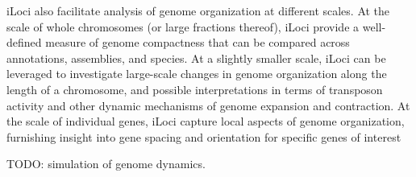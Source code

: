 iLoci also facilitate analysis of genome organization at different scales.
At the scale of whole chromosomes (or large fractions thereof), iLoci provide a well-defined measure of genome compactness that can be compared across annotations, assemblies, and species.
At a slightly smaller scale, iLoci can be leveraged to investigate large-scale changes in genome organization along the length of a chromosome, and possible interpretations in terms of transposon activity and other dynamic mechanisms of genome expansion and contraction.
At the scale of individual genes, iLoci capture local aspects of genome organization, furnishing insight into gene spacing and orientation for specific genes of interest

TODO: simulation of genome dynamics.




%






